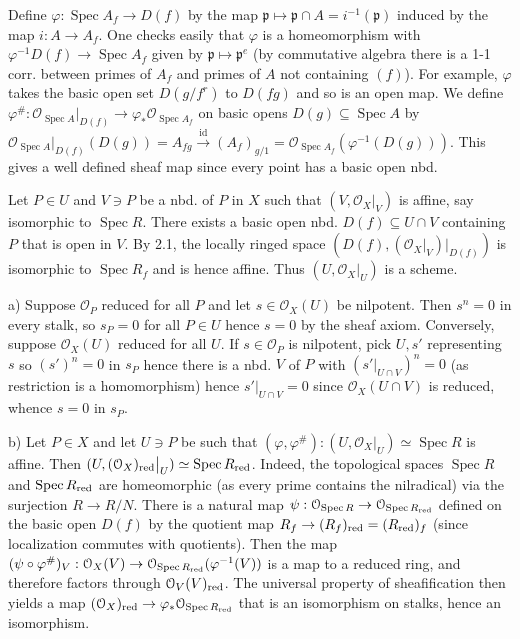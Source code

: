 \documentclass{report}
\newcommand{\p}{\mathfrak{p}}
\renewcommand{\O}{\mathcal{O}}
\DeclareMathOperator{\id}{id}
\DeclareMathOperator{\Spec}{Spec}
\begin{document}
  Define $\varphi:\Spec A_f\rightarrow D(f)$ by the map $\p\mapsto \p \cap A=i^{-1}(\p)$ induced by the map $i:A\rightarrow  A_f$.
One checks easily that $\varphi$ is a homeomorphism with $\varphi^{-1} D(f)\rightarrow \Spec A_f$ given by $\p\mapsto \p^e$
(by commutative algebra there is a 1-1 corr. between primes of $A_f$ and primes of $A$ not containing $(f)$).  
For example, $\varphi$ takes the basic open set $D(g/f^r)$ to $D(fg)$ and so is an open map.
We define $\varphi^{\#}:\O_{\Spec A}\big|_{D(f)}\rightarrow \varphi_*\O_{\Spec A_f}$ on basic opens $D(g)\subseteq \Spec A$
by $\O_{\Spec A}\big|_{D(f)}(D(g))=A_{fg}\xrightarrow{\id} (A_{f})_{g/1}=\O_{\Spec A_f}(\varphi^{-1}(D(g)))$.  This gives a well
defined sheaf map since every point has a basic open nbd.  

\bigskip
{}	Let $P\in U$ and $V\ni P$ be a nbd. of $P$ in $X$ such that $(V,\O_X\big|_{V})$ is affine, say isomorphic to $\Spec R$.
There exists a basic open nbd. $D(f)\subseteq U\cap V$ containing $P$ that is open in $V$.  By 2.1, the locally ringed
space $(D(f),(\O_{X}\big|_{V})\big|_{D(f)})$ is isomorphic to $\Spec R_f$ and is hence affine.  Thus $(U,\O_{X}\big|_{U})$ is
a scheme.

\bigskip
{}	a)  Suppose $\O_P$ reduced for all $P$ and let $s\in \O_X(U)$ be nilpotent.  Then $s^n=0$ in every stalk, so $s_P=0$
for all $P\in U$ hence $s=0$ by the sheaf axiom.  Conversely, suppose $\O_X(U)$ reduced for all $U$.  If $s\in \O_P$
is nilpotent, pick $U,s'$ representing $s$ so $(s')^n=0$ in $s_P$ hence there is a nbd. $V$ of $P$
with $(s'\big|_{U\cap V})^n=0$ (as restriction is a homomorphism) hence $s'\big|_{U\cap V}=0$ since $\O_X(U\cap V)$
is reduced, whence $s=0$ in $s_P$.

\noindent b)  Let $P\in X$ and let $U\ni P$ be such that $(\varphi,\varphi^{\#}):(U,\O_X\big|_{U})\simeq \Spec R$ is affine.  
Then $(U,(\O_X)_{\rm red}\big|_{U})\simeq \Spec R_{\rm red}$.  Indeed, the topological spaces
$\Spec R$ and $\Spec R_{\rm red}$ are homeomorphic (as every prime contains the nilradical) via the
surjection $R\rightarrow R/N$.  There is a natural map $\psi:\O_{\Spec R}\rightarrow \O_{\Spec R_{\rm red}}$
defined on the basic open $D(f)$ by the quotient map $R_f\rightarrow (R_f)_{\rm red}=(R_{\rm red})_f$
(since localization commutes with quotients).    
Then the map $(\psi\circ \varphi^{\#})_V:\O_X(V)\rightarrow \O_{\Spec R_{\rm red}}(\varphi^{-1}(V))$ is a map to a reduced
ring, and therefore factors through $\O_V(V)_{\rm red}$.  The universal property of sheafification then yields
a map $(\O_X)_{\rm red}\rightarrow \varphi_*\O_{\Spec R_{\rm red}}$ that is an isomorphism
on stalks, hence an isomorphism.  
\end{document}
